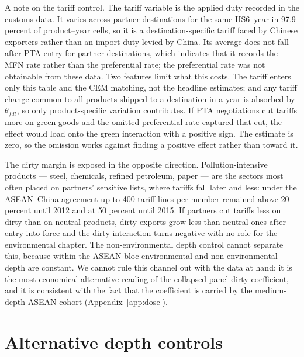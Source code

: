 \documentclass[12pt]{article}
\begin{document}
A note on the tariff control. The tariff variable is the applied duty recorded in the customs data. It varies across partner destinations for the same HS6--year in 97.9 percent of product--year cells, so it is a destination-specific tariff faced by Chinese exporters rather than an import duty levied by China. Its average does not fall after PTA entry for partner destinations, which indicates that it records the MFN rate rather than the preferential rate; the preferential rate was not obtainable from these data. Two features limit what this costs. The tariff enters only this table and the CEM matching, not the headline estimates; and any tariff change common to all products shipped to a destination in a year is absorbed by $\theta_{fdt}$, so only product-specific variation contributes. If PTA negotiations cut tariffs more on green goods and the omitted preferential rate captured that cut, the effect would load onto the green interaction with a positive sign. The estimate is zero, so the omission works against finding a positive effect rather than toward it.

The dirty margin is exposed in the opposite direction. Pollution-intensive products --- steel,
chemicals, refined petroleum, paper --- are the sectors most often placed on partners' sensitive
lists, where tariffs fall later and less: under the ASEAN--China agreement up to 400 tariff lines per
member remained above 20 percent until 2012 and at 50 percent until 2015. If partners cut tariffs less
on dirty than on neutral products, dirty exports grow less than neutral ones after entry into force
and the dirty interaction turns negative with no role for the environmental chapter. The
non-environmental depth control cannot separate this, because within the ASEAN bloc environmental
and non-environmental depth are constant. We cannot rule this channel out with the data at hand; it
is the most economical alternative reading of the collapsed-panel dirty coefficient, and it is
consistent with the fact that the coefficient is carried by the medium-depth ASEAN cohort
(Appendix~\ref{app:dose}).



\section{Alternative depth controls}\label{app:depthbounds}
\end{document}
